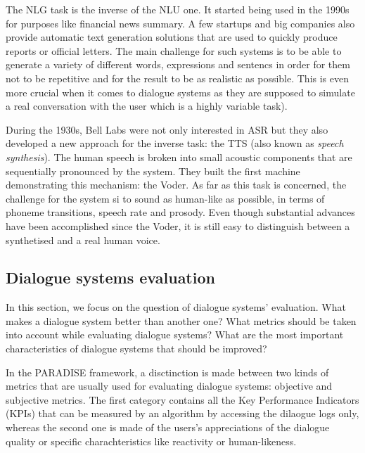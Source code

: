 		The NLG task is the inverse of the NLU one. It started being used in the 1990s for purposes like financial news summary. A few startups and big companies also provide automatic text generation solutions that are used to quickly produce reports or official letters. The main challenge for such systems is to be able to generate a variety of different words, expressions and sentencs in order for them not to be repetitive and for the result to be as realistic as possible. This is even more crucial when it comes to dialogue systems as they are supposed to simulate a real conversation with the user which is a highly variable task).

		During the 1930s, Bell Labs were not only interested in ASR but they also developed a new approach for the inverse task: the TTS (also known as \textit{speech synthesis}). The human speech is broken into small acoustic components that are sequentially pronounced by the system. They built the first machine demonstrating this mechanism: the Voder. As far as this task is concerned, the challenge for the system si to sound as human-like as possible, in terms of phoneme transitions, speech rate and prosody. Even though substantial advances have been accomplished since the Voder, it is still easy to distinguish between a synthetised and a real human voice.


        \subsection{Dialogue systems evaluation}

                In this section, we focus on the question of dialogue systems' evaluation. What makes a dialogue system better than another one? What metrics should be taken into account while evaluating dialogue systems? What are the most important characteristics of dialogue systems that should be improved?

                In the PARADISE framework, a disctinction is made between two kinds of metrics that are usually used for evaluating dialogue systems: objective and subjective metrics. The first category contains all the Key Performance Indicators (KPIs) that can be measured by an algorithm by accessing the dilaogue logs only, whereas the second one is made of the users's appreciations of the dialogue quality or specific charachteristics like reactivity or human-likeness.

